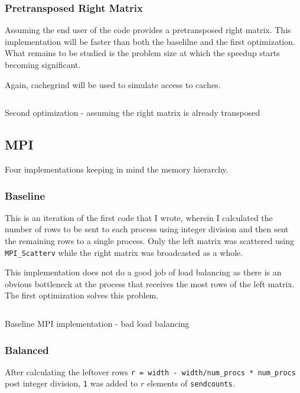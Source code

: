 \documentclass[a4paper]{article}
\newenvironment{code}{\captionsetup{type=listing}}{}
\begin{document}
\subsubsection*{Pretransposed Right Matrix}
Assuming the end user of the code provides a pretransposed right
matrix. This implementation will be faster than both the baselilne
and the first optimization. What remains to be studied is the
problem size at which the speedup starts becoming significant.

Again, cachegrind will be used to simulate access to caches.

\begin{code}
\inputminted[samepage=false, breaklines,  firstline=114, lastline=141]{c}{../src/impl_omp.c}
\label{lst:matmul_omp_pretranspose}
\caption{Second optimization - assuming the right matrix is
already transposed}
\end{code}      
 
\subsection*{MPI}
Four implementations keeping in mind the memory hierarchy.

\subsubsection*{Baseline}
This is an iteration of the first code that I wrote, wherein I
calculated the number of rows to be sent to each process using
integer division and then sent the remaining rows to a single process.
Only the left matrix was scattered using \texttt{MPI\_Scatterv} 
while the right matrix was broadcasted as a whole.

This implementation does not do a good job of load balancing as
there is an obvious bottleneck at the process that receives the most
rows of the left matrix. The first optimization solves this problem.

\begin{code}
\inputminted[samepage=false, breaklines, linenos, firstline=10, lastline=103]{c}{../src/impl_mpi.c}
\label{lst:matmul_mpi_baseline}
\caption{Baseline MPI implementation - bad load balancing}
\end{code}

\subsubsection*{Balanced}
After calculating the leftover rows \texttt{r = width - width/num\_procs * num\_procs} post integer division,
\texttt{1} was added to $r$ elements of \texttt{sendcounts}.
\end{document}
